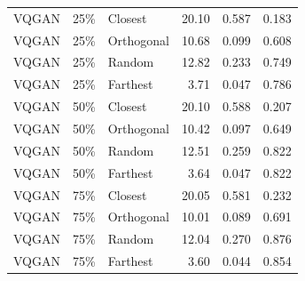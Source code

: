 \begin{longtable}{lllrrr}
VQGAN & 25\% & Closest & 20.10 & 0.587 & 0.183 \\
VQGAN & 25\% & Orthogonal & 10.68 & 0.099 & 0.608 \\
VQGAN & 25\% & Random & 12.82 & 0.233 & 0.749 \\
VQGAN & 25\% & Farthest & 3.71 & 0.047 & 0.786 \\
VQGAN & 50\% & Closest & 20.10 & 0.588 & 0.207 \\
VQGAN & 50\% & Orthogonal & 10.42 & 0.097 & 0.649 \\
VQGAN & 50\% & Random & 12.51 & 0.259 & 0.822 \\
VQGAN & 50\% & Farthest & 3.64 & 0.047 & 0.822 \\
VQGAN & 75\% & Closest & 20.05 & 0.581 & 0.232 \\
VQGAN & 75\% & Orthogonal & 10.01 & 0.089 & 0.691 \\
VQGAN & 75\% & Random & 12.04 & 0.270 & 0.876 \\
VQGAN & 75\% & Farthest & 3.60 & 0.044 & 0.854 \\
\end{longtable}
\endgroup

